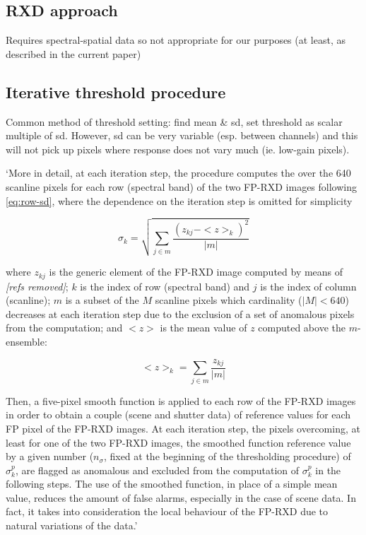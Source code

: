 \documentclass[10pt,fleqn]{article}
\begin{document}
\begin{itemize}
\subsection{RXD approach}
Requires spectral-spatial data so not appropriate for our purposes (at least, as described in the current paper)

\subsection{Iterative threshold procedure}
Common method of threshold setting: find mean \& sd, set threshold as scalar multiple of sd. However, sd can be very variable (esp. between channels) and this will not pick up pixels where response does not vary much (ie. low-gain pixels).

`More in detail, at each iteration step, the procedure computes the over the 640 scanline pixels for each row (spectral band) of the two FP-RXD images following \ref{eq:row-sd}, where the dependence on the iteration step is omitted for simplicity 

\begin{equation}
\label{eq:row-sd}
\sigma_k = \sqrt{\sum_{j \in m} \frac{(z_{kj} - <z>_k)^2}{\left|m \right|}}
\end{equation}

where $z_{kj}$ is the generic element of the FP-RXD image computed by means of \textit{[refs removed]}; $k$ is the index of row (spectral band) and $j$ is the index of column (scanline); $m$ is a subset of the $M$ scanline pixels which cardinality ($|M| < 640$) decreases at each iteration step due to the exclusion of a set of anomalous pixels from the computation; and $<z>$ is the mean value of $z$ computed above the $m$- ensemble:

\begin{equation}
\label{eq:adj-mean}
<z>_k = \sum_{j\in m} \frac{z_{kj}}{|m|}
\end{equation}

Then, a five-pixel smooth function is applied to each row of the FP-RXD images in order to obtain a couple (scene and shutter data) of reference values for each FP pixel of the FP-RXD images. At each iteration step, the pixels overcoming, at least for one of the two FP-RXD images, the smoothed function reference value by a given number ($n_\sigma$, fixed at the beginning of the thresholding procedure) of $\sigma_k^p$, are flagged as anomalous and excluded from the computation of $\sigma_k^p$ in the following steps. The use of the smoothed function, in place of a simple mean value, reduces the amount of false alarms, especially in the case of scene data. In fact, it takes into consideration the local behaviour of the  FP-RXD due to natural variations of the data.'


\end{itemize}
\end{document}

